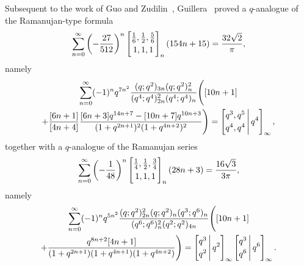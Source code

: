 \documentclass[12pt]{article}
\begin{document}
 Subsequent to the work of 
 Guo and Zudilin~\cite{GuoZudilin2018}, 
 Guillera~\cite{Guillera2018} proved a $q$-analogue of the Ramanujan-type formula 
 \begin{equation}\label{Ramanujantypeneg512}
 \sum_{n = 0}^{\infty} 
 \left( -\frac{27}{512} \right)^{n} 
 \left[ \begin{matrix} \frac{1}{6}, \frac{1}{2}, \frac{5}{6} \vspace{1mm} \\ 
 1, 1, 1 \end{matrix} \right]_{n} (154 n + 15) = \frac{32\sqrt{2}}{\pi}, 
\end{equation}
 namely 
\begin{multline*}
 \sum_{n=0}^{\infty} (-1)^n q^{7n^2} 
 \frac{ (q;q^2)_{3n} (q;q^2)_{n}^2 }{ (q^4;q^4)_{2n}^{2} (q^4;q^4)_{n} } \Bigg( [10n+1] \\ 
 + \frac{ [6n+1] }{ [4n+4] } \frac{ 
 [6n+3] q^{14n + 7} - [10n+7] q^{10n+3} }{ (1+q^{2n+1})^{2} (1 + q^{4n+2})^{2} } \Bigg) = 
 \left[ \begin{matrix} q^3, q^5 \vspace{1mm} \\ 
 q^4, q^4 \end{matrix} \, \Bigg| \, q^4 \right]_{\infty}, 
\end{multline*}
 together with a $q$-analogue of the Ramanujan series 
 \begin{equation*}
 \sum_{n = 
 0}^{\infty} 
 \left( -\frac{1}{48} \right)^{n} 
 \left[ \begin{matrix} \frac{1}{4}, \frac{1}{2}, \frac{3}{4} \vspace{1mm} \\ 
 1, 1, 1 \end{matrix} \right]_{n} (28 n + 3) 
 = \frac{16\sqrt{3}}{3\pi}, 
\end{equation*}
 namely
\begin{multline*}
 \sum_{n=0}^{\infty} (-1)^{n} q^{5n^2} 
 \frac{ (q;q^2)_{2n}^2 (q;q^2)_{n} (q^3;q^6)_{n} }{ 
 (q^6;q^6)_{n}^{2} (q^2;q^2)_{4n} } \Bigg( [10n + 1] \\ 
 + \frac{q^{8n + 2} [4n+1]}{(1+q^{2n+1})(1+q^{4n+1})(1+q^{4n+2})} \Bigg) = 
 \left[ \begin{matrix} q^3 \vspace{1mm} \\ 
 q^2 \end{matrix} \, \Bigg| \, q^2 \right]_{\infty} 
 \left[ \begin{matrix} q^3 \vspace{1mm} \\ 
 q^6 \end{matrix} \, \Bigg| \, q^6 \right]_{\infty}. 
 \end{multline*}
\end{document}
